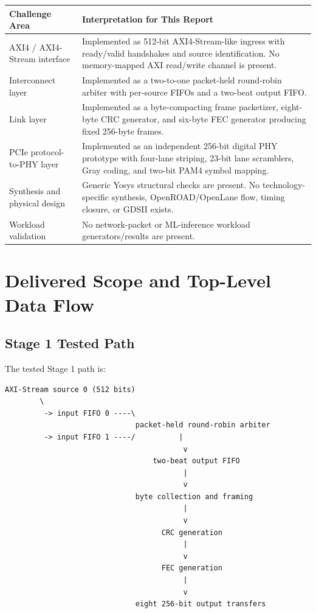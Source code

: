 \documentclass[11pt,a4paper]{article}
\begin{document}
\medskip
\noindent
\begin{tabularx}{\textwidth}{>{\raggedright\arraybackslash}p{} X}
\toprule
\textbf{Challenge Area} & \textbf{Interpretation for This Report} \\
\midrule
AXI4 / AXI4-Stream interface & Implemented as 512-bit AXI4-Stream-like ingress with
ready/valid handshakes and source identification. No memory-mapped AXI read/write channel
is present. \\
Interconnect layer & Implemented as a two-to-one packet-held round-robin arbiter with
per-source FIFOs and a two-beat output FIFO. \\
Link layer & Implemented as a byte-compacting frame packetizer, eight-byte CRC generator,
and six-byte FEC generator producing fixed 256-byte frames. \\
PCIe protocol-to-PHY layer & Implemented as an independent 256-bit digital PHY prototype
with four-lane striping, 23-bit lane scramblers, Gray coding, and two-bit PAM4 symbol
mapping. \\
Synthesis and physical design & Generic Yosys structural checks are present. No
technology-specific synthesis, OpenROAD/OpenLane flow, timing closure, or GDSII exists. \\
Workload validation & No network-packet or ML-inference workload generators/results are
present. \\
\bottomrule
\end{tabularx}

\section{Delivered Scope and Top-Level Data Flow}

\subsection{Stage 1 Tested Path}
The tested Stage 1 path is:

\begin{verbatim}
AXI-Stream source 0 (512 bits)
        \
         -> input FIFO 0 ----\
                              packet-held round-robin arbiter
         -> input FIFO 1 ----/          |
                                         v
                                  two-beat output FIFO
                                         |
                                         v
                              byte collection and framing
                                         |
                                         v
                                    CRC generation
                                         |
                                         v
                                    FEC generation
                                         |
                                         v
                              eight 256-bit output transfers
\end{verbatim}
\end{document}
